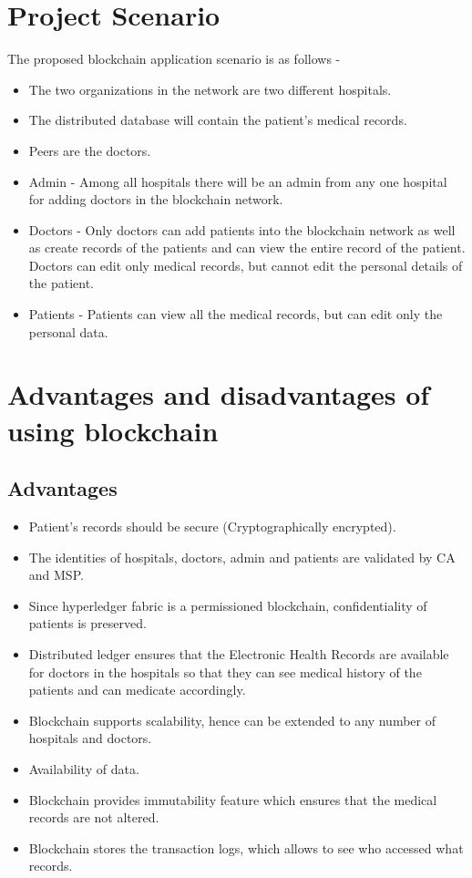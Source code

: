 \documentclass[journal,12pt,onecolumn]{IEEEtran}
\begin{document}
\section{Project Scenario}
The proposed blockchain application scenario is as follows -
\begin{itemize}
    \item The two organizations in the network are two different hospitals.
    \item The distributed database will contain the patient's medical records.
    \item Peers are the doctors.
    \item Admin - Among all hospitals there will be an admin from any one hospital for adding doctors in the blockchain network.
    \item Doctors - Only doctors can add patients into the blockchain network as well as create records of the patients and can view the entire record of the patient. Doctors can edit only medical records, but cannot edit the personal details of the patient.
    \item Patients - Patients can view all the medical records, but can edit only the personal data.
\end{itemize}


\section{Advantages and disadvantages of using blockchain}
\subsection{Advantages}
\begin{itemize}
    \item Patient's records should be secure (Cryptographically encrypted).
    \item The identities of hospitals, doctors, admin and patients are validated by CA and MSP.
    \item Since hyperledger fabric is a permissioned blockchain, confidentiality of patients is preserved.
    \item Distributed ledger ensures that the Electronic Health Records are available for doctors in the hospitals so that they can see medical history of the patients and can medicate accordingly.
    \item Blockchain supports scalability, hence can be extended to any number of hospitals and doctors.
    \item Availability of data.
    \item Blockchain provides immutability feature which ensures that the medical records are not altered.
    \item Blockchain stores the transaction logs, which allows to see who accessed what records. 
\end{itemize}
\end{document}
